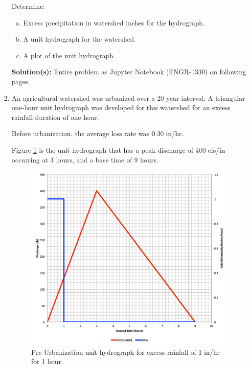 \documentclass[12pt]{article}
\begin{document}
\begin{enumerate}
Determine:
    \begin{enumerate}[a)]
        \item Excess precipitation in watershed inches for the hydrograph.
        \item A unit hydrograph for the watershed.
        \item A plot of the unit hydrograph.
    \end{enumerate}

\textbf{Solution(s):}
Entire problem as Jupyter Notebook (ENGR-1330) on following pages.


\clearpage


\item An agricultural watershed was urbanized over a 20 year interval.  A triangular one-hour unit hydrograph was developed for this watershed for an excess rainfall duration of one hour.  

Before urbanization, the average loss rate was 0.30 in/hr.  

Figure \ref{fig:UnitGraph1} is the unit hydrograph that has a peak discharge of 400 cfs/in occurring at 3 hours, and a base time of 9 hours.
\begin{figure}[h!] %
   \centering
   \includegraphics[width=5in]{UnitGraph1.jpg} 
   \caption{Pre-Urbanization unit hydrograph for excess rainfall of 1 in/hr for 1 hour.}
   \label{fig:UnitGraph1}
\end{figure}
\clearpage


\end{enumerate}
\end{document}
